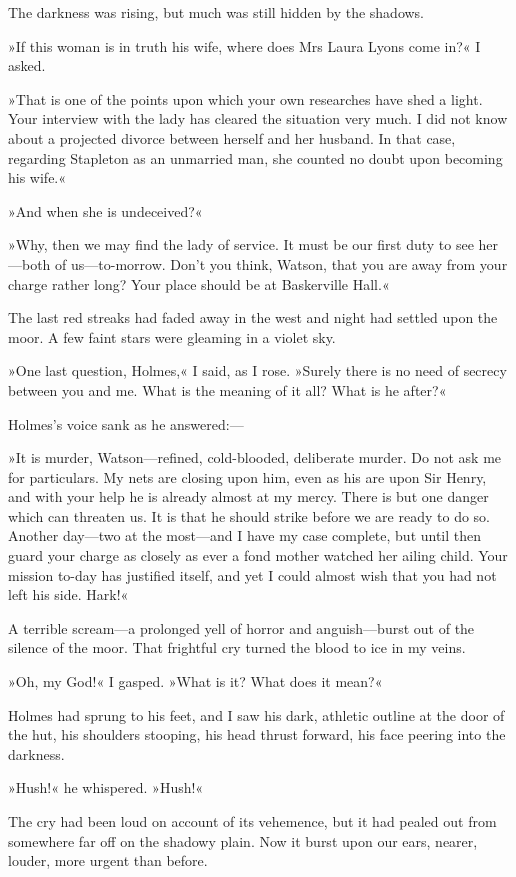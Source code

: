 The darkness was rising, but much was still hidden by the shadows.

»If this woman is in truth his wife, where does Mrs Laura Lyons come in?« I asked.

»That is one of the points upon which your own researches have shed a light. Your interview with the lady has cleared the situation very much. I did not know about a projected divorce between herself and her husband. In that case, regarding Stapleton as an unmarried man, she counted no doubt upon becoming his wife.«

»And when she is undeceived?«

»Why, then we may find the lady of service. It must be our first duty to see her—both of us—to-morrow. Don't you think, Watson, that you are away from your charge rather long? Your place should be at Baskerville Hall.«

The last red streaks had faded away in the west and night had settled upon the moor. A few faint stars were gleaming in a violet sky.

»One last question, Holmes,« I said, as I rose. »Surely there is no need of secrecy between you and me. What is the meaning of it all? What is he after?«

Holmes's voice sank as he answered:— 

»It is murder, Watson—refined, cold-blooded, deliberate mur\-der. Do not ask me for particulars. My nets are closing upon him, even as his are upon Sir Henry, and with your help he is already almost at my mercy. There is but one danger which can threaten us. It is that he should strike before we are ready to do so. Another day—two at the most—and I have my case complete, but until then guard your charge as closely as ever a fond mother watched her ailing child. Your mission to-day has justified itself, and yet I could almost wish that you had not left his side. Hark!«

A terrible scream—a prolonged yell of horror and anguish—burst out of the silence of the moor. That frightful cry turned the blood to ice in my veins.

»Oh, my God!« I gasped. »What is it? What does it mean?«

Holmes had sprung to his feet, and I saw his dark, athletic outline at the door of the hut, his shoulders stooping, his head thrust forward, his face peering into the darkness.

»Hush!« he whispered. »Hush!«

The cry had been loud on account of its vehemence, but it had pealed out from somewhere far off on the shadowy plain. Now it burst upon our ears, nearer, louder, more urgent than before.

